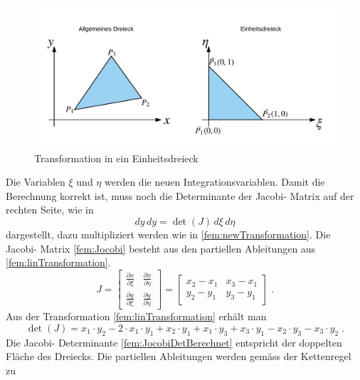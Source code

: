 \begin{figure}[h!]
	\centering
	\includegraphics[scale=0.8]{papers/fem/Images/Dreiecke.jpeg}
	\caption{Transformation in ein Einheitsdreieck}
	\label{fig:TransformationEinheitsdreieckBild}
\end{figure}
Die Variablen $\xi$ und $\eta$ werden die neuen Integrationsvariablen. Damit die Berechnung korrekt ist, muss noch die Determinante der Jacobi- Matrix auf der rechten Seite, wie in 
\begin{equation}
			dy \, dy = \det(J) \, d\xi \, d\eta
			\label{fem:newTransformation}
\end{equation}
dargestellt, dazu multipliziert werden wie in \eqref{fem:newTransformation}. Die Jacobi- Matrix \eqref{fem:Jocobi} besteht aus den partiellen Ableitungen aus \eqref{fem:linTransformation}.  
\begin{equation}
J %
=
\begin{bmatrix}
    \frac{\partial x}{\partial \xi} &  \frac{\partial x}{\partial \eta}     \\
   \frac{\partial y}{\partial \xi}  &  \frac{\partial y}{\partial \eta}     
\end{bmatrix}
= 
\begin{bmatrix}
    x_2 - x_1  &  x_3 -x_1      \\
    y_2 - y_1  &  y_3 - y_1      
\end{bmatrix} \; .
	\label{fem:Jocobi}
\end{equation}
Aus der Transformation \eqref{fem:linTransformation} erhält man 
\begin{equation}
	\det(J) = x_1 \cdot y_2 - 2 \cdot x_1 \cdot y_1 + x_2 \cdot y_1 + x_1\cdot y_3 + x_3 \cdot y_1 - x_2 \cdot y_3 - x_3 \cdot y_2 \; .
	\label{fem:JocobiDetBerechnet}
\end{equation}
Die Jacobi- Determinante \eqref{fem:JocobiDetBerechnet} entspricht der doppelten Fläche des Dreiecks. Die partiellen Ableitungen werden gemäss der Kettenregel zu 

